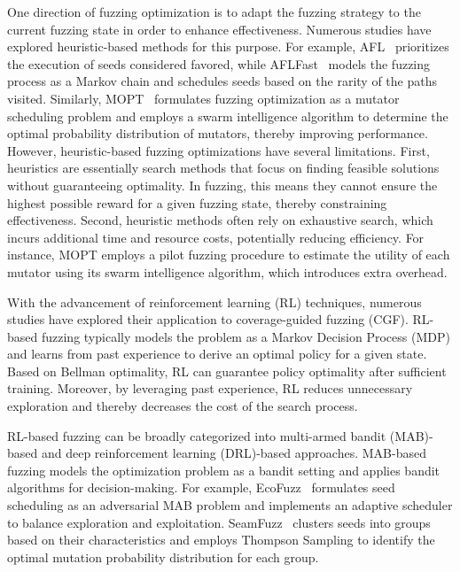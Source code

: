 \documentclass[lettersize,journal]{IEEEtran}
\begin{document}
One direction of fuzzing optimization is to adapt the fuzzing strategy to the current fuzzing state in order to enhance effectiveness. Numerous studies have explored heuristic-based methods for this purpose. For example, AFL~\cite{AmericanFuzzyLop} prioritizes the execution of seeds considered favored, while AFLFast~\cite{bohmeCoveragebasedGreyboxFuzzing2019} models the fuzzing process as a Markov chain and schedules seeds based on the rarity of the paths visited. Similarly, MOPT~\cite{lyuMOPTOptimizedMutation2019} formulates fuzzing optimization as a mutator scheduling problem and employs a swarm intelligence algorithm to determine the optimal probability distribution of mutators, thereby improving performance. However, heuristic-based fuzzing optimizations have several limitations. First, heuristics are essentially search methods that focus on finding feasible solutions without guaranteeing optimality. In fuzzing, this means they cannot ensure the highest possible reward for a given fuzzing state, thereby constraining effectiveness. Second, heuristic methods often rely on exhaustive search, which incurs additional time and resource costs, potentially reducing efficiency. For instance, MOPT employs a pilot fuzzing procedure to estimate the utility of each mutator using its swarm intelligence algorithm, which introduces extra overhead.

With the advancement of reinforcement learning (RL) techniques, numerous studies have explored their application to coverage-guided fuzzing (CGF). RL-based fuzzing typically models the problem as a Markov Decision Process (MDP) and learns from past experience to derive an optimal policy for a given state. Based on Bellman optimality, RL can guarantee policy optimality after sufficient training. Moreover, by leveraging past experience, RL reduces unnecessary exploration and thereby decreases the cost of the search process. 

RL-based fuzzing can be broadly categorized into multi-armed bandit (MAB)-based and deep reinforcement learning (DRL)-based approaches. MAB-based fuzzing models the optimization problem as a bandit setting and applies bandit algorithms for decision-making. For example, EcoFuzz~\cite{yueEcoFuzzAdaptiveEnergysaving2020} formulates seed scheduling as an adversarial MAB problem and implements an adaptive scheduler to balance exploration and exploitation. SeamFuzz~\cite{leeLearningSeedadaptiveMutation2023} clusters seeds into groups based on their characteristics and employs Thompson Sampling to identify the optimal mutation probability distribution for each group.
\end{document}
